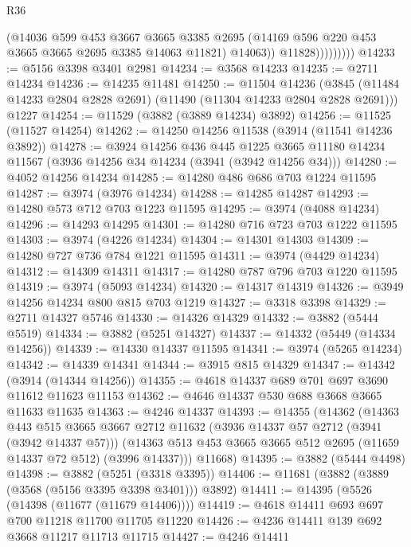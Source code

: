 \begin{lexlean}{R36}
\begin{coremodule}
                        (@14036
                          @599
                          @453
                          @3667
                          @3665
                          @3385
                          @2695
                          (@14169 @596 @220 @453 @3665 @3665 @2695 @3385 @14063 @11821)
                          @14063))
                      @11828)))))))))
@14233 := @5156 @3398 @3401 @2981
@14234 := @3568 @14233
@14235 := @2711 @14234
@14236 := @14235 @11481
@14250 := @11504
    @14236
    (@3845 (@11484 @14233 @2804 @2828 @2691) (@11490 (@11304 @14233 @2804 @2828 @2691)))
    @1227
@14254 := @11529 (@3882 (@3889 @14234) @3892)
@14256 := @11525 (@11527 @14254)
@14262 := @14250 @14256 @11538 (@3914 (@11541 @14236 @3892))
@14278 := @3924
    @14256
    @436
    @445
    @1225
    @3665
    @11180
    @14234
    @11567
    (@3936 @14256 @34 @14234 (@3941 (@3942 @14256 @34)))
@14280 := @4052 @14256 @14234
@14285 := @14280 @486 @686 @703 @1224 @11595
@14287 := @3974 (@3976 @14234)
@14288 := @14285 @14287
@14293 := @14280 @573 @712 @703 @1223 @11595
@14295 := @3974 (@4088 @14234)
@14296 := @14293 @14295
@14301 := @14280 @716 @723 @703 @1222 @11595
@14303 := @3974 (@4226 @14234)
@14304 := @14301 @14303
@14309 := @14280 @727 @736 @784 @1221 @11595
@14311 := @3974 (@4429 @14234)
@14312 := @14309 @14311
@14317 := @14280 @787 @796 @703 @1220 @11595
@14319 := @3974 (@5093 @14234)
@14320 := @14317 @14319
@14326 := @3949 @14256 @14234 @800 @815 @703 @1219
@14327 := @3318 @3398
@14329 := @2711 @14327 @5746
@14330 := @14326 @14329
@14332 := @3882 (@5444 @5519)
@14334 := @3882 (@5251 @14327)
@14337 := @14332 (@5449 (@14334 @14256))
@14339 := @14330 @14337 @11595
@14341 := @3974 (@5265 @14234)
@14342 := @14339 @14341
@14344 := @3915 @815 @14329
@14347 := @14342 (@3914 (@14344 @14256))
@14355 := @4618 @14337 @689 @701 @697 @3690 @11612 @11623 @11153
@14362 := @4646 @14337 @530 @688 @3668 @3665 @11633 @11635
@14363 := @4246 @14337
@14393 := @14355
    (@14362
      (@14363
        @443
        @515
        @3665
        @3667
        @2712
        @11632
        (@3936 @14337 @57 @2712 (@3941 (@3942 @14337 @57)))
        (@14363 @513 @453 @3665 @3665 @512 @2695 (@11659 @14337 @72 @512) (@3996 @14337)))
      @11668)
@14395 := @3882 (@5444 @4498)
@14398 := @3882 (@5251 (@3318 @3395))
@14406 := @11681 (@3882 (@3889 (@3568 (@5156 @3395 @3398 @3401))) @3892)
@14411 := @14395 (@5526 (@14398 (@11677 (@11679 @14406))))
@14419 := @4618 @14411 @693 @697 @700 @11218 @11700 @11705 @11220
@14426 := @4236 @14411 @139 @692 @3668 @11217 @11713 @11715
@14427 := @4246 @14411

\end{coremodule}
\end{lexlean}

